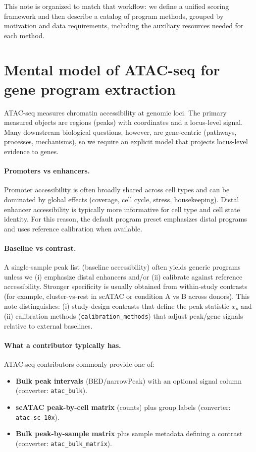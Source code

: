 \documentclass[11pt]{article}
\begin{document}
This note is organized to match that workflow: we define a unified scoring framework and then describe a catalog of program methods, grouped by motivation and data requirements, including the auxiliary resources needed for each method.

\section{Mental model of ATAC-seq for gene program extraction}
\label{sec:atac_mental_model}

ATAC-seq measures chromatin accessibility at genomic loci. The primary measured objects are regions (peaks) with coordinates and a locus-level signal. Many downstream biological questions, however, are gene-centric (pathways, processes, mechanisms), so we require an explicit model that projects locus-level evidence to genes.

\paragraph{Promoters vs enhancers.}
Promoter accessibility is often broadly shared across cell types and can be dominated by global effects (coverage, cell cycle, stress, housekeeping). Distal enhancer accessibility is typically more informative for cell type and cell state identity. For this reason, the default program preset emphasizes distal programs and uses reference calibration when available.

\paragraph{Baseline vs contrast.}
A single-sample peak list (baseline accessibility) often yields generic programs unless we (i) emphasize distal enhancers and/or (ii) calibrate against reference accessibility. Stronger specificity is usually obtained from within-study contrasts (for example, cluster-vs-rest in scATAC or condition A vs B across donors). This note distinguishes:
(i) study-design contrasts that define the peak statistic $x_p$ and
(ii) calibration methods (\texttt{calibration\_methods}) that adjust peak/gene signals relative to external baselines.

\paragraph{What a contributor typically has.}
ATAC-seq contributors commonly provide one of:
\begin{itemize}[leftmargin=2em]
\item \textbf{Bulk peak intervals} (BED/narrowPeak) with an optional signal column (converter: \texttt{atac\_bulk}).
\item \textbf{scATAC peak-by-cell matrix} (counts) plus group labels (converter: \texttt{atac\_sc\_10x}).
\item \textbf{Bulk peak-by-sample matrix} plus sample metadata defining a contrast (converter: \texttt{atac\_bulk\_matrix}).
\end{itemize}
\end{document}

